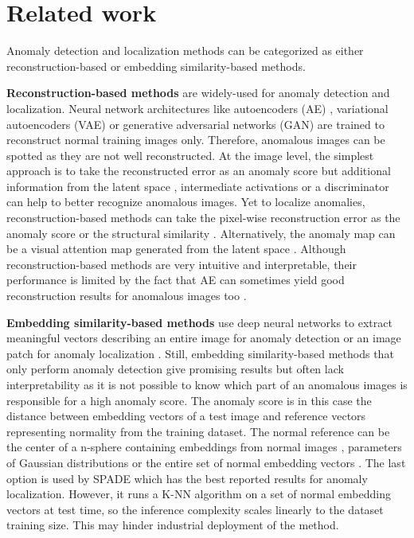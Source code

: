 \documentclass[a4paper,conference]{IEEEtran}
\begin{document}
\section{Related work}
Anomaly detection and localization methods can be categorized as either reconstruction-based or embedding similarity-based methods.

\textbf{Reconstruction-based methods} are widely-used for anomaly detection and localization. Neural network architectures like autoencoders (AE) \cite{Bergmann_2019, bergmann2019mvtec, gong2019memorizing, huang2019attribute}, variational autoencoders (VAE) \cite{kingma2013autoencoding, 8852144_vae, liu2019visually,venkataramanan2019attention} or generative adversarial networks (GAN) \cite{sabokrou2018adversarially, pidhorskyi2018generative, akcay2018ganomaly} are trained to reconstruct normal training images only. Therefore, anomalous images can be spotted as they are not well reconstructed. At the image level, the simplest approach is to take the reconstructed error as an anomaly score \cite{gong2019memorizing} but additional information from the latent space \cite{pidhorskyi2018generative, abati2018latent}, intermediate activations \cite{Kim2020RaPP} or a discriminator \cite{akay2019skipganomaly, akcay2018ganomaly} can help to better recognize anomalous images. Yet to localize anomalies, reconstruction-based methods can take the pixel-wise reconstruction error as the anomaly score \cite{bergmann2019mvtec} or the structural similarity \cite{Bergmann_2019}. Alternatively, the anomaly map can be a visual attention map generated from the latent space \cite{venkataramanan2019attention, liu2019visually}. Although reconstruction-based methods are very intuitive and interpretable, their performance is limited by the fact that AE can sometimes yield good reconstruction results for anomalous images too \cite{DBLP08550}.

\textbf{Embedding similarity-based methods} use deep neural networks to extract meaningful vectors describing an entire image for anomaly detection \cite{pmlr-v80-ruff18a, rippel2020modeling, bergman2020deep, Bergman2020Classification-Based} or an image patch for anomaly localization \cite{bergmann2019uninformed, cohen2020subimage, yi2020patch, Napoletano}. Still, embedding similarity-based methods that only perform anomaly detection give promising results but often lack interpretability  as it is not possible to know which part of an anomalous images is responsible for a high anomaly score. The anomaly score is in this case the distance between embedding vectors of a test image and reference vectors representing normality from the training dataset. The normal reference can be the center of a n-sphere containing embeddings from normal images \cite{pmlr-v80-ruff18a, yi2020patch}, parameters of Gaussian distributions \cite{rippel2020modeling, lee2018simple} or the entire set of normal embedding vectors \cite{bergman2020deep, cohen2020subimage}. The last option is used by SPADE \cite{cohen2020subimage} which has the best reported results for anomaly localization. However, it runs a K-NN algorithm on a set of normal embedding vectors at test time, so the inference complexity scales linearly to the dataset training size. This may hinder industrial deployment of the method. 
\end{document}

